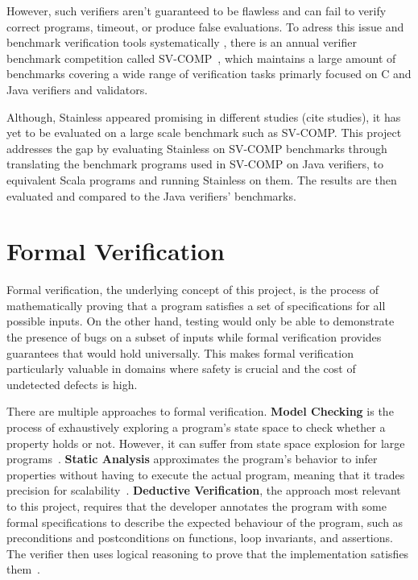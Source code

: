 \documentclass[11pt,titlepage,openright]{book}
\begin{document}
However, such verifiers aren't guaranteed to be flawless and can 
fail to verify correct programs, timeout, or produce false evaluations.
To adress this issue and benchmark verification tools systematically
, there is an annual verifier benchmark competition
called SV-COMP~\cite{SV-COMP}, which maintains a large amount 
of benchmarks covering a wide range of verification tasks primarly focused
on C and Java verifiers and validators. 
 
Although, Stainless appeared promising in different studies (cite studies), 
it has yet to be evaluated on a large scale benchmark such as SV-COMP.
This project addresses the gap by evaluating Stainless on SV-COMP benchmarks
through translating the benchmark programs used in SV-COMP on Java verifiers, 
to equivalent Scala programs and running Stainless on them. The results 
are then evaluated and compared to the Java verifiers' benchmarks.

\section{Formal Verification}

Formal verification, the underlying concept of 
this project, is the process of 
mathematically proving that a program satisfies a set 
of specifications for all possible inputs. 
On the other hand, testing would only be able to demonstrate 
the presence of bugs on a subset of inputs while formal 
verification provides guarantees that would hold universally. 
This makes formal verification particularly valuable in 
domains where safety is crucial and the cost of 
undetected defects is high.

There are multiple approaches to formal verification. 
\textbf{Model Checking} is the process of 
    exhaustively exploring a program's state space to 
    check whether a property holds or not. 
    However, it can suffer from state space explosion for 
    large programs~\cite{ModelChecking}.
\textbf{Static Analysis} approximates the program's behavior 
    to infer properties without having to execute the actual 
    program, meaning that it trades precision for scalability~\cite{StaticAnalysis}.
\textbf{Deductive Verification}, the approach most
    relevant to this project, requires that the developer 
    annotates the program with some formal specifications to 
    describe the expected behaviour of the program, such 
    as preconditions and postconditions on functions, loop invariants, 
    and assertions. The verifier then uses logical reasoning to prove that the 
    implementation satisfies them~\cite{DeductiveVerification}.
\end{document}
